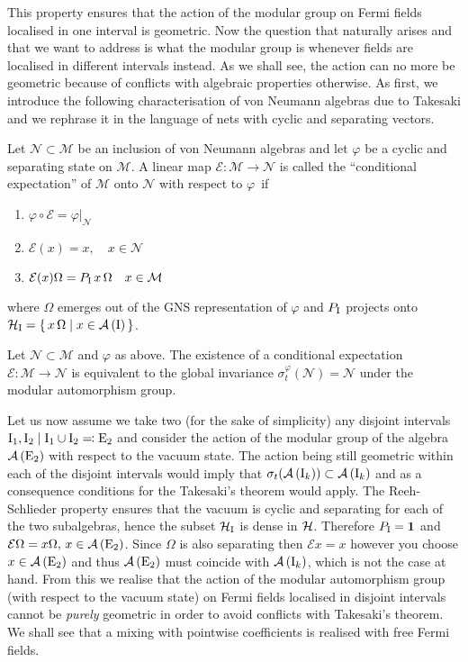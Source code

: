  \bigskip
 This property ensures that the action of the modular group
 on Fermi fields localised in one interval is geometric. Now
 the question that naturally arises and that we want to address
 is what the modular group is whenever fields are localised
 in different intervals instead. As we shall see, the action
 can no more be geometric because of conflicts with algebraic
 properties otherwise. As first, we introduce the following 
 characterisation of von Neumann algebras due to Takesaki 
 \cite{Tak:1970}
 and we rephrase it in the language of nets with cyclic
 and separating vectors. 
 \begin{definition}
 Let $\mathcal{N}\subset\mathcal{M}$ be an inclusion of
 von Neumann algebras and let $\varphi$ be a cyclic and
 separating state on 
 $\mathcal{M}$. A linear map $\mathcal{E}\colon\mathcal{M}
 \to\mathcal{N}$ is called the ``conditional expectation''
 of $\mathcal{M}$ onto $\mathcal{N}$ with respect to
 $\varphi$~if
  \begin{enumerate}
   \item $\varphi\circ\mathcal{E}=\varphi|_{\mathcal{N}}$
   \item $\mathcal{E}(x)=x,\quad x\in\mathcal{N}$
   \item $\mathcal{E}(x) \Omega=P_{\textrm{I}}\,x\,\Omega
          \quad x\in\mathcal{M}$
  \end{enumerate}
 where $\Omega$ emerges out of the \ac{GNS} representation
 of $\varphi$ and $P_{\textrm{I}}$ projects onto
 $\mathcal{H}_{\textrm{I}}=\set{x\,\Omega\mid x\in\mathcal{A}\left(\textrm{I}\right)}$.
 \end{definition}
 \begin{theorem}
 Let $\mathcal{N}\subset\mathcal{M}$ and $\varphi$ as above. 
 The existence of a conditional expectation 
 $\mathcal{E}\colon\mathcal{M} \to\mathcal{N}$ is equivalent
 to the global invariance $\sigma_t^{\varphi}(\mathcal{N})=
 \mathcal{N}$ under the modular automorphism group. 
 \end{theorem}
 Let us now assume we take two (for the sake of simplicity)
 any disjoint intervals $\textrm{I}_1,\textrm{I}_2\mid \textrm{I}_1\cup\textrm{I}_2\eqqcolon \textrm{E}_2$
 and consider the action of the modular group of the algebra
 $\mathcal{A}\left(\textrm{E}_2\right)$ with respect
 to the vacuum state. The action being still 
 geometric within each of the disjoint intervals
 would imply that $\sigma_t(\mathcal{A}\left(\textrm{I}_k\right))\subset\mathcal{A}\left(\textrm{I}_k\right)$ and
 as a consequence conditions for the Takesaki's theorem would
 apply. The Reeh-Schlieder property ensures that the vacuum
 is cyclic and separating for each of the two subalgebras, hence
 the subset $\mathcal{H}_{\textrm{I}}$ is dense in $\mathcal{H}$. Therefore $P_{\textrm{I}}=
 \bm{1}$ and $\mathcal{E}\Omega=x\Omega,\,x\in\mathcal{A}\left(\textrm{E}_2\right)$.
 Since $\Omega$ is also separating then $\mathcal{E}x=x$ however
 you choose $x\in\mathcal{A}\left(\textrm{E}_2\right)$ and thus $\mathcal{A}\left(\textrm{E}_2\right)$
 must coincide with $\mathcal{A}\left(\textrm{I}_k\right)$, which is not the case at hand.
 From this we realise that the action of the modular automorphism
 group (with respect to the vacuum state)
 on Fermi fields localised in disjoint intervals cannot be
 \emph{purely} geometric in order to avoid conflicts with
 Takesaki's theorem. We shall see that 
 a mixing with pointwise coefficients is 
 realised with free Fermi fields.
 
